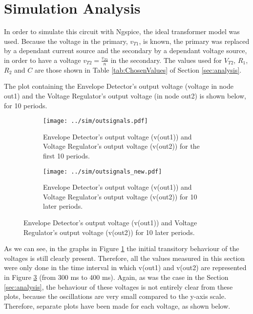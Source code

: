 \section{Simulation Analysis} \label{sec:simulation}

In order to simulate this circuit with Ngspice, the ideal transformer model was used. Because the voltage in the primary, $v_{T1}$, is known, the primary was replaced by a dependant current source and the secondary by a dependant voltage source, in order to have a voltage $v_{T2}=\frac{v_{T2}}{n}$ in the secondary. The values used for $V_{T2}$, $R_1$, $R_2$ and $C$ are those shown in Table \ref{tab:ChosenValues} of Section \ref{sec:analysis}.
\par
The plot containing the Envelope Detector's output voltage (voltage in node out1) and the Voltage Regulator's output voltage (in node out2) is shown below, for 10 periods.

\begin{figure}[H]
  \begin{subfigure}{.49\linewidth}
    \centering
    \texttt{[image: ../sim/outsignals.pdf]}
    \footnotesize
  \caption{Envelope Detector's output voltage (v(out1)) and Voltage Regulator's output voltage (v(out2)) for the first 10 periods.}
   \label{fig:out1_out2}
  \end{subfigure}
  \hspace{5mm}
  \begin{subfigure}{.49\linewidth}
    \centering
  \texttt{[image: ../sim/outsignals\_new.pdf]}
  \caption{Envelope Detector's output voltage (v(out1)) and Voltage Regulator's output voltage (v(out2)) for 10 later periods.}
  \label{fig:out1_out2_new}
  \end{subfigure}
\end{figure}

As we can see, in the graphs in Figure \ref{fig:out1_out2} the initial transitory behaviour of the voltages is still clearly present. Therefore, all the values measured in this section were only done in the time interval in which v(out1) and v(out2) are represented in Figure \ref{fig:out1_out2_new} (from 300 ms to 400 ms). Again, as was the case in the Section \ref{sec:analysis}, the behaviour of these voltages is not entirely clear from these plots, because the oscillations are very small compared to the y-axis scale. Therefore, separate plots have been made for each voltage, as shown below.

